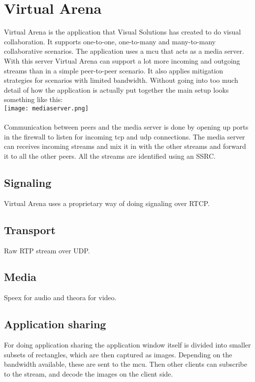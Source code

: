 \section{Virtual Arena}
Virtual Arena is the application that Visual Solutions has created to do visual collaboration\cite{VirtualArena}. It supports one-to-one, one-to-many and many-to-many collaborative scenarios. The application uses a \gls{mcu} that acts as a media server. With this server Virtual Arena can support a lot more incoming and outgoing streams than in a simple peer-to-peer scenario. It also applies mitigation strategies for scenarios with limited bandwidth. Without going into too much detail of how the application is actually put together the main setup looks something like this: 
\\
\texttt{[image: mediaserver.png]}
\\
\\
Communication between peers and the media server is done by opening up ports in the firewall to listen for incoming tcp and udp connections. The media server can receives incoming streams and mix it in with the other streams and forward it to all the other peers. All the streams are identified using an SSRC.

\subsection{Signaling}
Virtual Arena uses a proprietary way of doing signaling over RTCP.

\subsection{Transport}
Raw RTP stream over UDP.

\subsection{Media}
Speex for audio and theora for video.

\subsection{Application sharing}
For doing application sharing the application window itself is divided into smaller subsets of rectangles, which are then captured as images. Depending on the bandwidth available, these are sent to the \gls{mcu}. Then other clients can subscribe to the stream, and decode the images on the client side.


